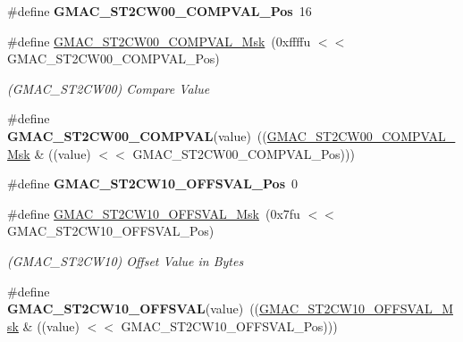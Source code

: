 \begin{DoxyCompactItemize}
\item 
\mbox{\label{group__SAMV71__GMAC_ga0e7d568d3dfbe2b28ea917847ad715ad}} 
\#define {\bfseries G\+M\+A\+C\+\_\+\+S\+T2\+C\+W00\+\_\+\+C\+O\+M\+P\+V\+A\+L\+\_\+\+Pos}~16
\item 
\mbox{\label{group__SAMV71__GMAC_ga9e15226a0db8a1f3e35ab499ef9c9971}} 
\#define \mbox{\hyperlink{group__SAMV71__GMAC_ga9e15226a0db8a1f3e35ab499ef9c9971}{G\+M\+A\+C\+\_\+\+S\+T2\+C\+W00\+\_\+\+C\+O\+M\+P\+V\+A\+L\+\_\+\+Msk}}~(0xffffu $<$$<$ G\+M\+A\+C\+\_\+\+S\+T2\+C\+W00\+\_\+\+C\+O\+M\+P\+V\+A\+L\+\_\+\+Pos)
\begin{DoxyCompactList}\small\item\em (G\+M\+A\+C\+\_\+\+S\+T2\+C\+W00) Compare Value \end{DoxyCompactList}\item 
\mbox{\label{group__SAMV71__GMAC_ga935fe8c271a3b1fd8cc7b23bb2df6444}} 
\#define {\bfseries G\+M\+A\+C\+\_\+\+S\+T2\+C\+W00\+\_\+\+C\+O\+M\+P\+V\+AL}(value)~((\mbox{\hyperlink{group__SAMV71__GMAC_ga9e15226a0db8a1f3e35ab499ef9c9971}{G\+M\+A\+C\+\_\+\+S\+T2\+C\+W00\+\_\+\+C\+O\+M\+P\+V\+A\+L\+\_\+\+Msk}} \& ((value) $<$$<$ G\+M\+A\+C\+\_\+\+S\+T2\+C\+W00\+\_\+\+C\+O\+M\+P\+V\+A\+L\+\_\+\+Pos)))
\item 
\mbox{\label{group__SAMV71__GMAC_gaf630978e5a8d5b8f76322f7a967e39d0}} 
\#define {\bfseries G\+M\+A\+C\+\_\+\+S\+T2\+C\+W10\+\_\+\+O\+F\+F\+S\+V\+A\+L\+\_\+\+Pos}~0
\item 
\mbox{\label{group__SAMV71__GMAC_gae900e27a75eabf8330e037cd615f7b51}} 
\#define \mbox{\hyperlink{group__SAMV71__GMAC_gae900e27a75eabf8330e037cd615f7b51}{G\+M\+A\+C\+\_\+\+S\+T2\+C\+W10\+\_\+\+O\+F\+F\+S\+V\+A\+L\+\_\+\+Msk}}~(0x7fu $<$$<$ G\+M\+A\+C\+\_\+\+S\+T2\+C\+W10\+\_\+\+O\+F\+F\+S\+V\+A\+L\+\_\+\+Pos)
\begin{DoxyCompactList}\small\item\em (G\+M\+A\+C\+\_\+\+S\+T2\+C\+W10) Offset Value in Bytes \end{DoxyCompactList}\item 
\mbox{\label{group__SAMV71__GMAC_gae825778fadbaf984dcd819d9992895f8}} 
\#define {\bfseries G\+M\+A\+C\+\_\+\+S\+T2\+C\+W10\+\_\+\+O\+F\+F\+S\+V\+AL}(value)~((\mbox{\hyperlink{group__SAMV71__GMAC_gae900e27a75eabf8330e037cd615f7b51}{G\+M\+A\+C\+\_\+\+S\+T2\+C\+W10\+\_\+\+O\+F\+F\+S\+V\+A\+L\+\_\+\+Msk}} \& ((value) $<$$<$ G\+M\+A\+C\+\_\+\+S\+T2\+C\+W10\+\_\+\+O\+F\+F\+S\+V\+A\+L\+\_\+\+Pos)))

\end{DoxyCompactItemize}
